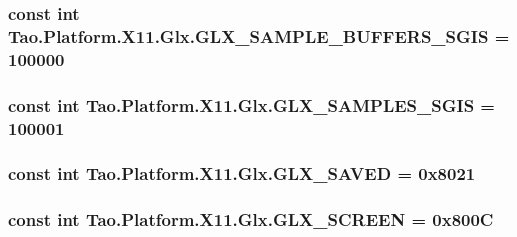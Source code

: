 \label{class_tao_1_1_platform_1_1_x11_1_1_glx_a9d98f89beff5043030c657aa94352647}
\hypertarget{class_tao_1_1_platform_1_1_x11_1_1_glx_aa93523144cfdbd8382aa99383205c17d}{
\subsubsection[{GLX\_\-SAMPLE\_\-BUFFERS\_\-SGIS}]{\setlength{\rightskip}{0pt plus 5cm}const int {\bf Tao.Platform.X11.Glx.GLX\_\-SAMPLE\_\-BUFFERS\_\-SGIS} = 100000}}
\label{class_tao_1_1_platform_1_1_x11_1_1_glx_aa93523144cfdbd8382aa99383205c17d}
\hypertarget{class_tao_1_1_platform_1_1_x11_1_1_glx_acbb6099d7e93d979f469e8f4e74d908f}{
\subsubsection[{GLX\_\-SAMPLES\_\-SGIS}]{\setlength{\rightskip}{0pt plus 5cm}const int {\bf Tao.Platform.X11.Glx.GLX\_\-SAMPLES\_\-SGIS} = 100001}}
\label{class_tao_1_1_platform_1_1_x11_1_1_glx_acbb6099d7e93d979f469e8f4e74d908f}
\hypertarget{class_tao_1_1_platform_1_1_x11_1_1_glx_ae496c91203442a990a7c9d65e68d437a}{
\subsubsection[{GLX\_\-SAVED}]{\setlength{\rightskip}{0pt plus 5cm}const int {\bf Tao.Platform.X11.Glx.GLX\_\-SAVED} = 0x8021}}
\label{class_tao_1_1_platform_1_1_x11_1_1_glx_ae496c91203442a990a7c9d65e68d437a}
\hypertarget{class_tao_1_1_platform_1_1_x11_1_1_glx_a0b9ae4d32b7263fa6c4a8c8fa35030c9}{
\subsubsection[{GLX\_\-SCREEN}]{\setlength{\rightskip}{0pt plus 5cm}const int {\bf Tao.Platform.X11.Glx.GLX\_\-SCREEN} = 0x800C}}
